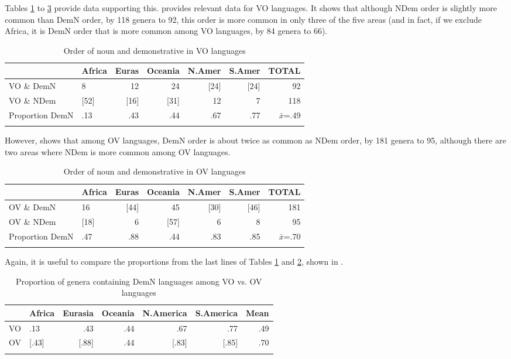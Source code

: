 \documentclass[output=paper]{langsci/langscibook}
\begin{document}
Tables \ref{tab:dryer:11} to \ref{tab:dryer:13} provide data supporting this.  provides relevant data for VO languages. It shows that although NDem order is slightly more common than DemN order, by 118 genera to 92, this order is more common in only three of the five areas (and in fact, if we exclude Africa, it is DemN order that is more common among VO languages, by 84 genera to 66).

\begin{table}
\begin{tabularx}{\textwidth}{llrrrrr} 
\lsptoprule
& \bfseries Africa & \bfseries Euras & \bfseries Oceania & \bfseries N.Amer & \bfseries S.Amer & \bfseries TOTAL\\
\midrule 
VO \& DemN & 8 & 12 & 24 & [24] & [24] & 92\\
VO \& NDem & [52] & [16] & [31] & 12 & 7 & 118\\
Proportion DemN & .13 & .43 & .44 & .67 & .77 & $\bar{x}$=.49\\
\lspbottomrule
\end{tabularx}
\caption{\label{tab:dryer:11}Order of noun and demonstrative in VO languages}
\end{table}


\noindent However,  shows that among OV languages, DemN order is about twice as common as NDem order, by 181 genera to 95, although there are two areas where NDem is more common among OV languages.

\begin{table}
\begin{tabularx}{\textwidth}{llrrrrr}
\lsptoprule
& \bfseries Africa & \bfseries Euras & \bfseries Oceania & \bfseries N.Amer & \bfseries S.Amer & \bfseries TOTAL\\
\midrule
OV \& DemN & 16 & [44] & 45 & [30] & [46] & 181\\
OV \& NDem & [18] & 6 & [57] & 6 & 8 & 95\\
Proportion DemN & .47 & .88 & .44 & .83 & .85 & $\bar{x}$=.70\\
\lspbottomrule
\end{tabularx}
\caption{\label{tab:dryer:12}Order of noun and demonstrative in OV languages}
\end{table}

Again, it is useful to compare the proportions from the last lines of Tables \ref{tab:dryer:11} and \ref{tab:dryer:12}, shown in .

\begin{table}
\begin{tabularx}{\textwidth}{Xlrrrrr}
\lsptoprule
& \bfseries Africa & \bfseries Eurasia & \bfseries Oceania & \bfseries N.America & \bfseries S.America & \bfseries Mean\\
\midrule
VO & .13 & .43 & .44 & .67 & .77 & .49\\
OV & [.43] & [.88] & .44 & [.83] & [.85] & .70\\
\lspbottomrule
\end{tabularx}
\caption{\label{tab:dryer:13}Proportion of genera containing DemN languages among VO vs. OV languages} 
\end{table}
\end{document}
